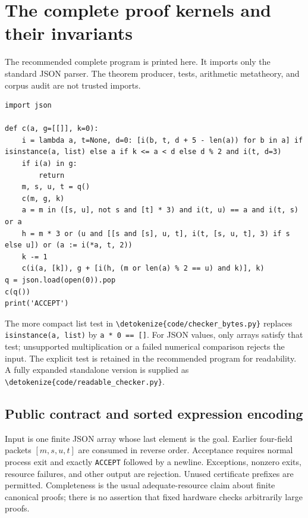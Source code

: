 \documentclass[11pt]{article}
\theoremstyle{definition}\newtheorem{definition}[theorem]{Definition}
\newcommand{\file}[1]{\expandafter\nolinkurl\expandafter{\detokenize{#1}}}
\begin{document}
\section{The complete proof kernels and their invariants}
\label{sec:kernel}
The recommended complete program is printed here. It imports only the
standard JSON parser. The theorem producer, tests, arithmetic metatheory,
and corpus audit are not trusted imports.
\begin{lstlisting}
import json

def c(a, g=[[]], k=0):
    i = lambda a, t=None, d=0: [i(b, t, d + 5 - len(a)) for b in a] if isinstance(a, list) else a if k <= a < d else d % 2 and i(t, d=3)
    if i(a) in g:
        return
    m, s, u, t = q()
    c(m, g, k)
    a = m in ([s, u], not s and [t] * 3) and i(t, u) == a and i(t, s) or a
    h = m * 3 or (u and [[s and [s], u, t], i(t, [s, u, t], 3) if s else u]) or (a := i(*a, t, 2))
    k -= 1
    c(i(a, [k]), g + [i(h, (m or len(a) % 2 == u) and k)], k)
q = json.load(open(0)).pop
c(q())
print('ACCEPT')
\end{lstlisting}
The more compact list test in \file{code/checker_bytes.py} replaces
\texttt{isinstance(a, list)} by \texttt{a * 0 == []}. For JSON values,
only arrays satisfy that test; unsupported multiplication or a failed
numerical comparison rejects the input. The explicit test is retained
in the recommended program for readability. A fully expanded standalone
version is supplied as \file{code/readable_checker.py}.

\subsection{Public contract and sorted expression encoding}
Input is one finite JSON array whose last element is the goal. Earlier
four-field packets $[m,s,u,t]$ are consumed in reverse order. Acceptance
requires normal process exit and exactly \texttt{ACCEPT} followed by a
newline. Exceptions, nonzero exits, resource failures, and other output
are rejection. Unused certificate prefixes are permitted. Completeness
is the usual adequate-resource claim about finite canonical proofs;
there is no assertion that fixed hardware checks arbitrarily large proofs.
\end{document}
